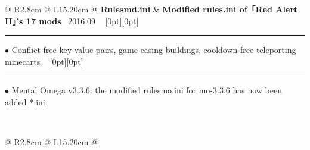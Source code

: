 {{\begin{tabularx}{\linewidth}{@{} R{2.8cm} @{\phantom{d}} L{15.20cm} @{}}
	\textbf{Rulesmd.ini} & \hspace{9pt} \textbf{Modified rules.ini of「Red Alert II」's 17 mods} \hfill \textendash\ 2016.09 \newline \vspace{2pt} \ \hspace{-3pt} \raisebox{0.09\height}[0pt][0pt]{\vrule width0.5pt height30.0pt} \hspace{-0.30em}\rule[0.25em]{1.0em}{0.5pt}\!\! $\bullet$ {\small Conflict-free key-value pairs, game-easing buildings, cooldown-free teleporting minecarts} \newline \vspace{-3pt} \ \hspace{-3pt} \raisebox{0.18\height}[0pt][0pt]{\vrule width0.5pt height14.5pt} \hspace{-0.30em}\rule[0.25em]{1.0em}{0.5pt}\!\! $\bullet$ {\small Mental Omega v3.3.6: the modified rulesmo.ini for mo-3.3.6 has now been added} \hfill {\small \color{color-detail} *.ini} \href{https://github.com/ChenZhu-Xie/rulesmd.ini}{\color{black!50}\faGithub} \\ \Gap\Gap\Gap
\end{tabularx}
\\
\begin{tabularx}{\linewidth}{@{} R{2.8cm} @{\phantom{d}} L{15.20cm} @{}}

\end{tabularx}}}
